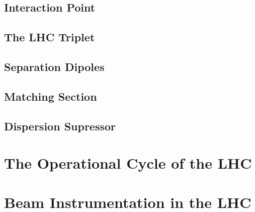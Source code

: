 \subsection{Interaction Point}

\subsection{The LHC Triplet}

\subsection{Separation Dipoles}

\subsection{Matching Section}

\subsection{Dispersion Supressor}


\section{The Operational Cycle of the LHC}


\section{Beam Instrumentation in the LHC}






